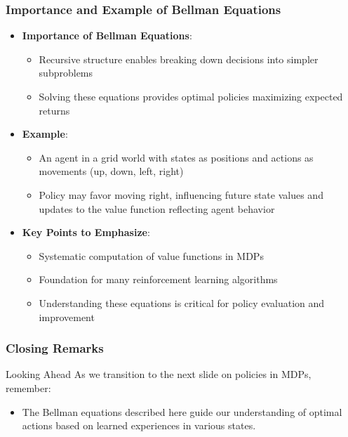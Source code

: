 \documentclass[aspectratio=169]{beamer}
\begin{document}
\begin{frame}[fragile]
    \frametitle{Importance and Example of Bellman Equations}
    \begin{itemize}
        \item \textbf{Importance of Bellman Equations}:
            \begin{itemize}
                \item Recursive structure enables breaking down decisions into simpler subproblems
                \item Solving these equations provides optimal policies maximizing expected returns
            \end{itemize}

        \item \textbf{Example}:
            \begin{itemize}
                \item An agent in a grid world with states as positions and actions as movements (up, down, left, right)
                \item Policy may favor moving right, influencing future state values and updates to the value function reflecting agent behavior
            \end{itemize}

        \item \textbf{Key Points to Emphasize}:
            \begin{itemize}
                \item Systematic computation of value functions in MDPs
                \item Foundation for many reinforcement learning algorithms
                \item Understanding these equations is critical for policy evaluation and improvement
            \end{itemize}
    \end{itemize}
\end{frame}

\begin{frame}[fragile]
    \frametitle{Closing Remarks}
    \begin{block}{Looking Ahead}
        As we transition to the next slide on policies in MDPs, remember:
        \begin{itemize}
            \item The Bellman equations described here guide our understanding of optimal actions based on learned experiences in various states.
        \end{itemize}
    \end{block}
\end{frame}
\end{document}
